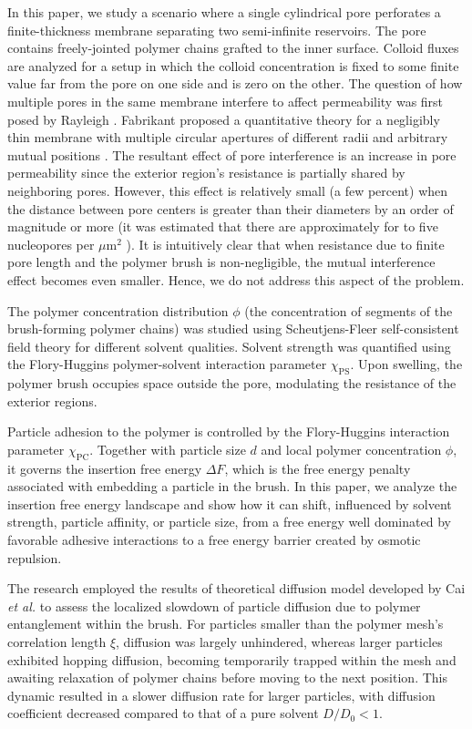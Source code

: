 \documentclass[12pt, a4paper]{article}
\begin{document}
In this paper, we study a scenario where a single cylindrical pore perforates a finite-thickness membrane separating two semi-infinite reservoirs.
The pore contains freely-jointed polymer chains grafted to the inner surface.
Colloid fluxes are analyzed for a setup in which the colloid concentration is fixed to some finite value far from the pore on one side and is zero on the other.
The question of how multiple pores in the same membrane interfere to affect permeability was first posed by Rayleigh \cite{Strutt1878}.
Fabrikant proposed a quantitative theory for a negligibly thin membrane with multiple circular apertures of different radii and arbitrary mutual positions \cite{Fabrikant1985}.
The resultant effect of pore interference is an increase in pore permeability since the exterior region's resistance is partially shared by neighboring pores.
However, this effect is relatively small (a few percent) when the distance between pore centers is greater than their diameters by an order of magnitude or more (it was estimated that there are approximately for to five nucleopores per $\mu\text{m}^2$ \cite{Yang2004, Daigle2001, Feldherr1984, Kubitscheck2000}). 
It is intuitively clear that when resistance due to finite pore length and the polymer brush is non-negligible, the mutual interference effect becomes even smaller.
Hence, we do not address this aspect of the problem.

The polymer concentration distribution $\phi$ (the concentration of segments of the brush-forming polymer chains) was studied using Scheutjens-Fleer self-consistent field theory for different solvent qualities.
Solvent strength was quantified using the Flory-Huggins polymer-solvent interaction parameter $\chi_{\text{PS}}$.
Upon swelling, the polymer brush occupies space outside the pore, modulating the resistance of the exterior regions.

Particle adhesion to the polymer is controlled by the Flory-Huggins interaction parameter $\chi_{\text{PC}}$.
Together with particle size $d$ and local polymer concentration $\phi$, it governs the insertion free energy $\Delta F$, which is the free energy penalty associated with embedding a particle in the brush.
In this paper, we analyze the insertion free energy landscape and show how it can shift, influenced by solvent strength, particle affinity, or particle size, 
from a free energy well dominated by favorable adhesive interactions to a free energy barrier created by osmotic repulsion.

The research employed the results of theoretical diffusion model developed by Cai \emph{et al.} \cite{Cai2011} to assess the localized slowdown of particle diffusion due to polymer entanglement within the brush.
For particles smaller than the polymer mesh's correlation length $\xi$, diffusion was largely unhindered, whereas larger particles exhibited hopping diffusion, becoming temporarily trapped within the mesh and awaiting relaxation of polymer chains before moving to the next position.
This dynamic resulted in a slower diffusion rate for larger particles, with diffusion coefficient decreased compared to that of a pure solvent $D/D_0 < 1$.
\end{document}
